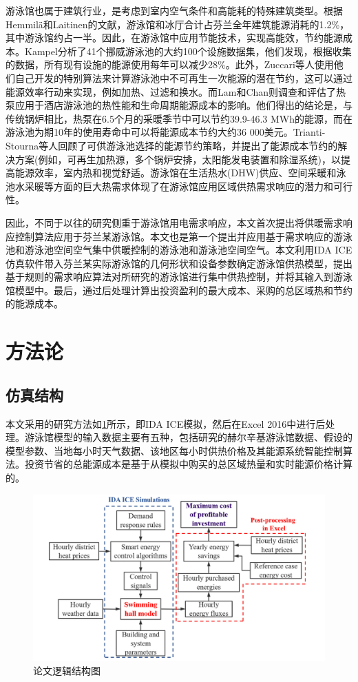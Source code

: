 \documentclass[hyperref]{ctexart}
\begin{document}
\begin{multicols}{2}
		\par
		游泳馆也属于建筑行业，是考虑到室内空气条件和高能耗的特殊建筑类型。根据Hemmilä和Laitinen的文献，游泳馆和冰厅合计占芬兰全年建筑能源消耗的1.2\%，其中游泳馆约占一半。因此，在游泳馆中应用节能技术，实现高能效，节约能源成本。Kampel分析了41个挪威游泳池的大约100个设施数据集，他们发现，根据收集的数据，所有现有设施的能源使用每年可以减少28\%。此外，Zuccari等人使用他们自己开发的特别算法来计算游泳池中不可再生一次能源的潜在节约，这可以通过能源效率行动来实现，例如加热、过滤和换水。而Lam和Chan则调查和评估了热泵应用于酒店游泳池的热性能和生命周期能源成本的影响。他们得出的结论是，与传统锅炉相比，热泵在6.5个月的采暖季节中可以节约39.9-46.3 MWh的能源，而在游泳池为期10年的使用寿命中可以将能源成本节约大约36 000美元。Trianti-Stourna等人回顾了可供游泳池选择的能源节约策略，并提出了能源成本节约的解决方案(例如，可再生加热源，多个锅炉安排，太阳能发电装置和除湿系统)，以提高能源效率，室内热和视觉舒适。游泳馆在生活热水(DHW)供应、空间采暖和泳池水采暖等方面的巨大热需求体现了在游泳馆应用区域供热需求响应的潜力和可行性。
		\par
		因此，不同于以往的研究侧重于游泳馆用电需求响应，本文首次提出将供暖需求响应控制算法应用于芬兰某游泳馆。本文也是第一个提出并应用基于需求响应的游泳池和游泳池空间空气集中供暖控制的游泳池和游泳池空间空气。本文利用IDA ICE仿真软件带入芬兰某实际游泳馆的几何形状和设备参数确定游泳馆供热模型，提出基于规则的需求响应算法对所研究的游泳馆进行集中供热控制，并将其输入到游泳馆模型中。最后，通过后处理计算出投资盈利的最大成本、采购的总区域热和节约的能源成本。
		\par
		\section{方法论}
		\subsection{仿真结构}
		本文采用的研究方法如\cref{fig1}所示，即IDA ICE模拟，然后在Excel 2016中进行后处理。游泳馆模型的输入数据主要有五种，包括研究的赫尔辛基游泳馆数据、假设的模型参数、当地每小时天气数据、该地区每小时供热价格及其能源系统智能控制算法。投资节省的总能源成本是基于从模拟中购买的总区域热量和实时能源价格计算的。
		\par
		\begin{figure}[htbp]
			\centering
			\includegraphics[scale=0.4]{figure_translate/1.png}
			\caption{论文逻辑结构图} \label{fig1}
		\end{figure}

\end{multicols}
\end{document}
